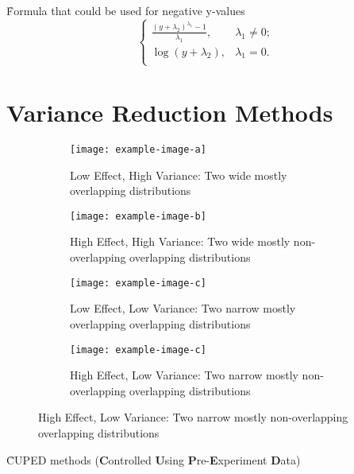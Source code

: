 \r{Formula that could be used for negative y-values}
\begin{equation}
	\begin{cases} 
		\frac
		{({{y + \lambda_2}})^{\lambda_1} - 1}
		{\lambda_1},  & {\lambda_1} \neq 0; \\
		\log ({y+{\lambda_2}}), & {\lambda_1} = 0. \\
	\end{cases}
\end{equation}



\section{Variance Reduction Methods}


{}
\begin{figure}
	\begin{subfigure}{6cm}
		\centering\texttt{[image: example-image-a]}
		\caption{Low Effect, High Variance: Two wide mostly overlapping distributions}
	\end{subfigure}
	\begin{subfigure}{6cm}
		\centering\texttt{[image: example-image-b]}
		\caption{High Effect, High Variance: Two wide mostly non-overlapping overlapping distributions}
	\end{subfigure}
	
	\begin{subfigure}{6cm}
		\centering\texttt{[image: example-image-c]}
		\caption{Low Effect, Low Variance: Two narrow mostly overlapping overlapping distributions}
	\end{subfigure}
	\begin{subfigure}{6cm}
		\centering\texttt{[image: example-image-c]}
		\caption{High Effect, Low Variance: Two narrow mostly non-overlapping overlapping distributions}
	\end{subfigure}
\end{figure}

\r{CUPED methods (\textbf{C}ontrolled \textbf{U}sing \textbf{P}re-\textbf{E}xperiment \textbf{D}ata)\cite{deng2013improving}}

